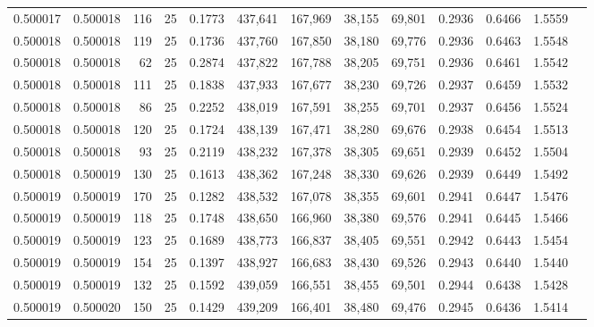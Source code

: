 \begin{tabular}{rrrrrrrrrrrrr}
0.500017 & 0.500018 &   116 &  25 &                                     0.1773 & 437,641 & 167,969 &  38,155 &  69,801 & 0.2936 & 0.6466 & 1.5559 \\
0.500018 & 0.500018 &   119 &  25 &                                     0.1736 & 437,760 & 167,850 &  38,180 &  69,776 & 0.2936 & 0.6463 & 1.5548 \\
0.500018 & 0.500018 &    62 &  25 &                                     0.2874 & 437,822 & 167,788 &  38,205 &  69,751 & 0.2936 & 0.6461 & 1.5542 \\
0.500018 & 0.500018 &   111 &  25 &                                     0.1838 & 437,933 & 167,677 &  38,230 &  69,726 & 0.2937 & 0.6459 & 1.5532 \\
0.500018 & 0.500018 &    86 &  25 &                                     0.2252 & 438,019 & 167,591 &  38,255 &  69,701 & 0.2937 & 0.6456 & 1.5524 \\
0.500018 & 0.500018 &   120 &  25 &                                     0.1724 & 438,139 & 167,471 &  38,280 &  69,676 & 0.2938 & 0.6454 & 1.5513 \\
0.500018 & 0.500018 &    93 &  25 &                                     0.2119 & 438,232 & 167,378 &  38,305 &  69,651 & 0.2939 & 0.6452 & 1.5504 \\
0.500018 & 0.500019 &   130 &  25 &                                     0.1613 & 438,362 & 167,248 &  38,330 &  69,626 & 0.2939 & 0.6449 & 1.5492 \\
0.500019 & 0.500019 &   170 &  25 &                                     0.1282 & 438,532 & 167,078 &  38,355 &  69,601 & 0.2941 & 0.6447 & 1.5476 \\
0.500019 & 0.500019 &   118 &  25 &                                     0.1748 & 438,650 & 166,960 &  38,380 &  69,576 & 0.2941 & 0.6445 & 1.5466 \\
0.500019 & 0.500019 &   123 &  25 &                                     0.1689 & 438,773 & 166,837 &  38,405 &  69,551 & 0.2942 & 0.6443 & 1.5454 \\
0.500019 & 0.500019 &   154 &  25 &                                     0.1397 & 438,927 & 166,683 &  38,430 &  69,526 & 0.2943 & 0.6440 & 1.5440 \\
0.500019 & 0.500019 &   132 &  25 &                                     0.1592 & 439,059 & 166,551 &  38,455 &  69,501 & 0.2944 & 0.6438 & 1.5428 \\
0.500019 & 0.500020 &   150 &  25 &                                     0.1429 & 439,209 & 166,401 &  38,480 &  69,476 & 0.2945 & 0.6436 & 1.5414 \\

\end{tabular}

